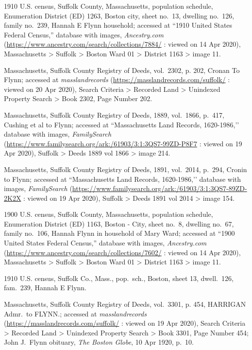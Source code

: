 \begin{thebibliography}{999}
1910 U.S. census, Suffolk County, Massachusetts, population schedule, Enumeration District (ED) 1263, Boston city, sheet no.\ 13, dwelling no.\ 126, family no.\ 239, Hannah E Flynn household; accessed at ``1910 United States Federal Census,'' database with images, \textit{Ancestry.com} (\url{https://www.ancestry.com/search/collections/7884/} : viewed on 14 Apr 2020), Massachusetts > Suffolk > Boston Ward 01 > District 1163 > image 11.

Massachusetts, Suffolk County Registry of Deeds, vol.\ 2302, p. 202, Cronan To Flynn; accessed at \textit{masslandrecords} (\url{https://masslandrecords.com/suffolk/} : viewed on 20 Apr 2020), Search Criteria > Recorded Land > Unindexed Property Search > Book 2302, Page Number 202.

Massachusetts, Suffolk County Registry of Deeds, 1889, vol.\ 1866, p.\ 417, Cushing et al to Flynn; accessed at ``Massachusetts Land Records, 1620-1986,’’ database with images, \textit{FamilySearch} (\url{https://www.familysearch.org/ark:/61903/3:1:3QS7-99ZD-P8F7} : viewed on 19 Apr 2020), Suffolk > Deeds 1889 vol 1866 > image 214.

Massachusetts, Suffolk County Registry of Deeds, 1891, vol.\ 2014, p.\ 294, Cronin to Flynn; accessed at ``Massachusetts Land Records, 1620-1986,’’ database with images, \textit{FamilySearch} (\url{https://www.familysearch.org/ark:/61903/3:1:3QS7-89ZD-2K2X} : viewed on 19 Apr 2020), Suffolk > Deeds 1891 vol 2014 > image 154.

1900 U.S. census, Suffolk County, Massachusetts, population schedule, Enumeration District (ED) 1163, Boston - City, sheet no.\ 8, dwelling no.\ 67, family no.\ 106, Hannah Flynn in household of Mary Ward; accessed at ``1900 United States Federal Census,'' database with images, \textit{Ancestry.com} (\url{https://www.ancestry.com/search/collections/7602/} : viewed on 14 Apr 2020), Massachusetts > Suffolk > Boston Ward 01 > District 1163 > image 11.

1910 U.S. census, Suffolk Co., Mass., pop.\ sch., Boston, sheet 13, dwell.\ 126, fam.\ 239, Hannah E Flynn.

Massachusetts, Suffolk County Registry of Deeds, vol.\ 3301, p. 454, HARRIGAN Admr.\ to FLYNN.; accessed at \textit{masslandrecords} (\url{https://masslandrecords.com/suffolk/} : viewed on 19 Apr 2020), Search Criteria > Recorded Land > Unindexed Property Search >  Book 3301, Page Number 454; John J.\ Flynn obituary, \textit{The Boston Globe}, 10 Apr 1920, p.\ 10.


\end{thebibliography}
